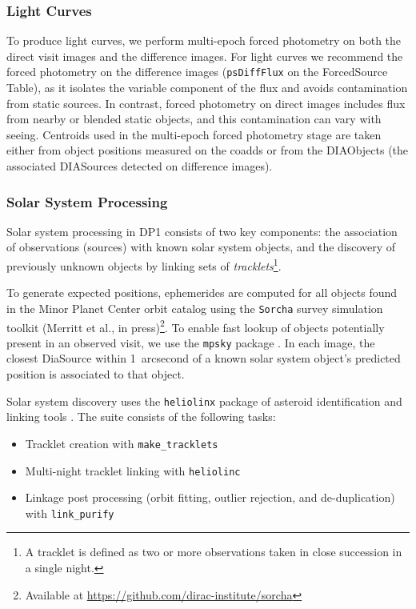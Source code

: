 \subsubsection{Light Curves}
\label{sssec:lightcurves}
To produce light curves, we perform multi-epoch \gls{forced photometry} on both the direct visit images and the difference images.
For light curves we recommend the \gls{forced photometry} on the difference images (\texttt{psDiffFlux} on the ForcedSource Table), as it isolates the variable component of the flux and avoids contamination from static sources.
In contrast, \gls{forced photometry} on direct images includes flux from nearby or blended static objects, and this contamination can vary with seeing.
Centroids used in the multi-epoch \gls{forced photometry} stage are taken either from object positions measured on the coadds or from the DIAObjects (the associated DIASources detected on difference images).

\subsubsection{Solar System Processing
\label{sec:drp:solsys}}

Solar system processing in \gls{DP1} consists of two key components: the association of observations (sources) with known solar system objects, and the discovery of previously unknown objects by linking sets of {\em tracklets}\footnote{A tracklet is defined as two or more observations taken in close succession in a single night.}.

To generate expected positions, ephemerides are computed for all objects found in the Minor Planet \gls{Center} orbit catalog using the \texttt{Sorcha} survey simulation toolkit (Merritt et al., in press)\footnote{Available at \url{https://github.com/dirac-institute/sorcha}}.
To enable fast lookup of objects potentially present in an observed visit, we use the {\tt mpsky} package \citep{mpsky}.
In each image, the closest DiaSource within 1~arcsecond of a known solar system object's predicted position is associated to that object.

Solar system discovery uses the {\tt heliolinx} package of asteroid identification and linking tools \citep{heliolinx}.
The suite consists of the following tasks:
\begin{itemize}
    \item Tracklet creation with {\tt make\_tracklets}
    \item Multi-night \gls{tracklet} linking with {\tt heliolinc}
    \item Linkage post processing (orbit fitting, outlier rejection, and de-duplication) with {\tt link\_purify}
\end{itemize}

